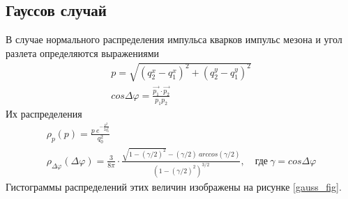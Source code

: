 \documentclass[12pt]{article}
\renewcommand{\l}{\left( }
\renewcommand{\r}{\right) }
\renewcommand{\phi}{\varphi}
\newcommand{\br}[1]{\l {#1} \r}
\begin{document}
\subsection{Гауссов случай}
В случае нормального распределения импульса кварков импульс мезона и угол разлета определяются выражениями
\begin{eqnarray}
p = \sqrt{\br{q_2^x - q_1^x}^2 + \br{q_2^y - q_1^y}^2} \\
cos \Delta \phi = \frac{\vec{p_1} \cdot \vec{p_2}}{p_1 p_2}
\end{eqnarray}
Их распределения
\begin{gather}
\rho_p \br{p} = \frac{p \ e^{-\frac{p^2}{2q_0^2}}}{q_0^2} \\
\rho_{\Delta \phi} \br{\Delta \phi} = \frac{3}{8 \pi} \cdot \frac{\sqrt{1 - \br{\gamma / 2}^2} - \br{\gamma / 2} \ arccos \br{\gamma / 2}}{\br{1 - \br{\gamma/2}^2}^{3/2}}, \quad \text{где} \ \gamma = cos \Delta \phi
\end{gather}
Гистограммы распределений этих величин изображены на рисунке \ref{gauss_fig}.
\end{document}
